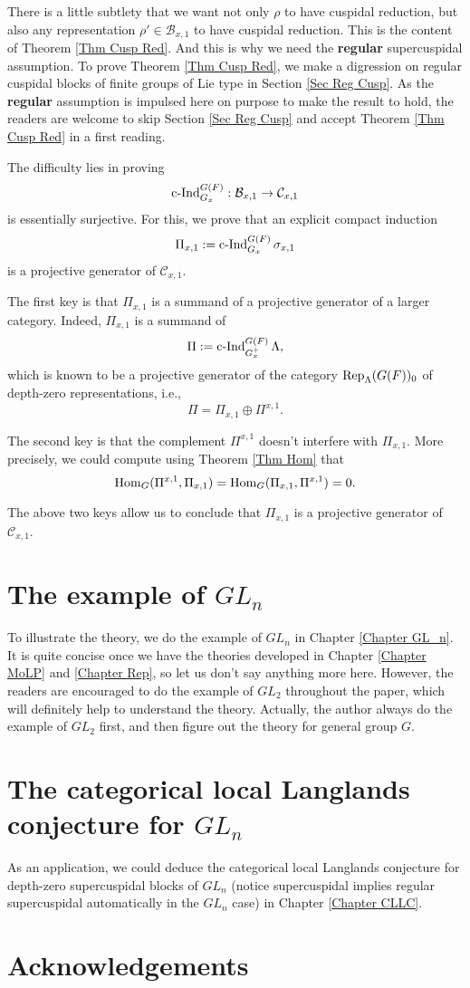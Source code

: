 There is a little subtlety that we want not only $\rho$ to have cuspidal reduction, but also any representation $\rho' \in \mathcal{B}_{x,1}$ to have cuspidal reduction. This is the content of Theorem \ref{Thm Cusp Red}. And this is why we need the \textbf{regular} supercuspidal assumption. To prove Theorem \ref{Thm Cusp Red}, we make a digression on regular cuspidal blocks of finite groups of Lie type in Section \ref{Sec Reg Cusp}. As the \textbf{regular} assumption is impulsed here on purpose to make the result to hold, the readers are welcome to skip Section \ref{Sec Reg Cusp} and accept Theorem \ref{Thm Cusp Red} in a first reading.

The difficulty lies in proving
$$\operatorname{\operatorname{c-Ind}}_{G_x}^{G(F)}: \mathcal{B}_{x,1} \to \mathcal{C}_{x,1}$$
is essentially surjective. For this, we prove that an explicit compact induction $$\Pi_{x,1}:=\operatorname{\operatorname{c-Ind}}_{G_x}^{G(F)}\sigma_{x,1}$$ 
is a projective generator of $\mathcal{C}_{x,1}$. 

The first key is that $\Pi_{x,1}$ is a summand of a projective generator of a larger category. Indeed, $\Pi_{x,1}$ is a summand of
$$\Pi:=\operatorname{\operatorname{c-Ind}}_{G_x^+}^{G(F)}\Lambda,$$
which is known to be a projective generator of the category $\operatorname{\operatorname{Rep}}_{\Lambda}(G(F))_0$ of depth-zero representations, i.e., 
$$\Pi=\Pi_{x,1} \oplus \Pi^{x,1}.$$

The second key is that the complement $\Pi^{x,1}$ doesn't interfere with $\Pi_{x,1}$. More precisely, we could compute using Theorem \ref{Thm Hom} that 
$$\operatorname{\operatorname{Hom}}_{G}(\Pi^{x,1}, \Pi_{x,1})=\operatorname{\operatorname{Hom}}_{G}(\Pi_{x,1}, \Pi^{x,1})=0.$$

The above two keys allow us to conclude that $\Pi_{x,1}$ is a projective generator of $\mathcal{C}_{x,1}$. 




\section{The example of $GL_n$}

To illustrate the theory, we do the example of $GL_n$ in Chapter \ref{Chapter GL_n}. It is quite concise once we have the theories developed in Chapter \ref{Chapter MoLP} and \ref{Chapter Rep}, so let us don't say anything more here. However, the readers are encouraged to do the example of $GL_2$ throughout the paper, which will definitely help to understand the theory. Actually, the author always do the example of $GL_2$ first, and then figure out the theory for general group $G$.

\section{The categorical local Langlands conjecture for $GL_n$}

As an application, we could deduce the categorical local Langlands conjecture for depth-zero supercuspidal blocks of $GL_n$ (notice supercuspidal implies regular supercuspidal automatically in the $GL_n$ case) in Chapter \ref{Chapter CLLC}.

\section{Acknowledgements}
